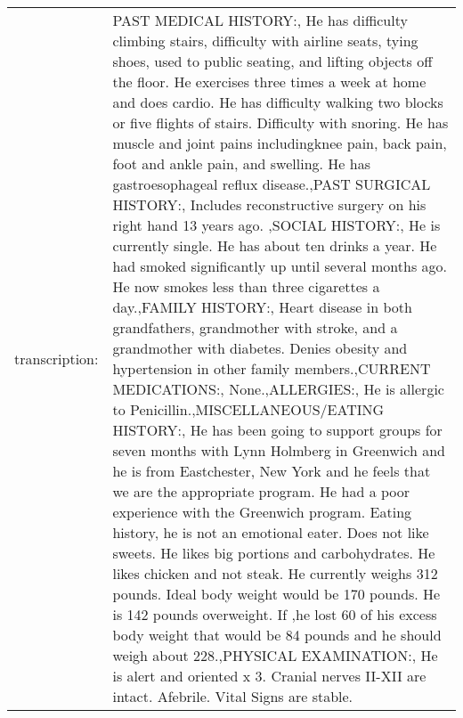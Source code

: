 \begin{table}[h]
\begin{tabularx}{\textwidth}{|l|X|}
        transcription:        & PAST MEDICAL HISTORY:, He has difficulty climbing stairs, difficulty with airline seats, tying shoes, used to public seating, and lifting objects off the floor.  He exercises three times a week at home and does cardio.  He has difficulty walking two blocks or five flights of stairs.  Difficulty with snoring.  He has muscle and joint pains includingknee pain, back pain, foot and ankle pain, and swelling.  He has gastroesophageal reflux disease.,PAST SURGICAL HISTORY:, Includes reconstructive surgery on his right hand 13 years ago.  ,SOCIAL HISTORY:, He is currently single.  He has about ten drinks a year.  He had smoked significantly up until several months ago.  He now smokes less than three cigarettes a day.,FAMILY HISTORY:, Heart disease in both grandfathers, grandmother with stroke, and a grandmother with diabetes.  Denies obesity and hypertension in other family members.,CURRENT MEDICATIONS:, None.,ALLERGIES:,  He is allergic to Penicillin.,MISCELLANEOUS/EATING HISTORY:, He has been going to support groups for seven months with Lynn Holmberg in Greenwich and he is from Eastchester, New York and he feels that we are the appropriate program.  He had a poor experience with the Greenwich program.  Eating history, he is not an emotional eater.  Does not like sweets.  He likes big portions and carbohydrates.  He likes chicken and not steak.  He currently weighs 312 pounds.  Ideal body weight would be 170 pounds.  He is 142 pounds overweight.  If ,he lost 60 of his excess body weight that would be 84 pounds and he should weigh about 228.,PHYSICAL EXAMINATION:, He is alert and oriented x 3.  Cranial nerves II-XII are intact.  Afebrile.  Vital Signs are stable. \\

\end{tabularx}
\end{table}
